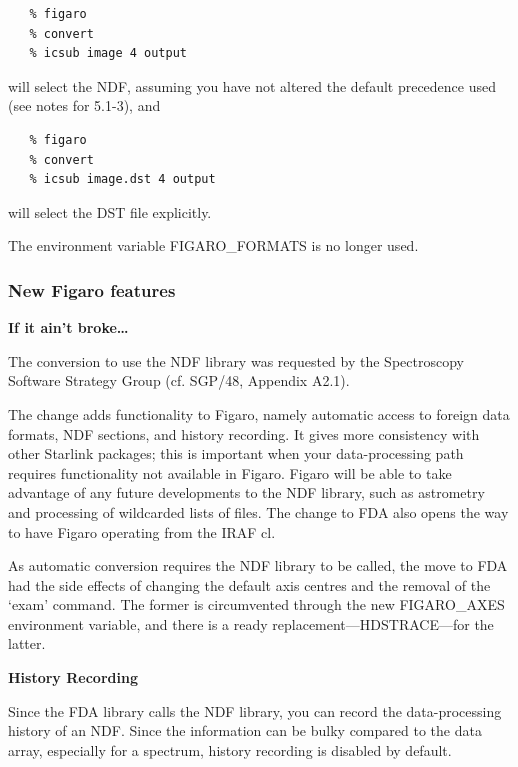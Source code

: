 \documentclass[11pt,twoside]{article}
\begin{document}
\begin{enumerate}
\begin{verbatim}
   % figaro
   % convert
   % icsub image 4 output
\end{verbatim}

      will select the NDF, assuming you have not altered the default
      precedence used (see notes for 5.1-3), and

\begin{verbatim}
   % figaro
   % convert
   % icsub image.dst 4 output
\end{verbatim}

      will select the DST file explicitly.

      The environment variable FIGARO\_FORMATS is no longer used.
\end{enumerate}

\subsubsection{\label{news514_new_features}New Figaro features}

{\bf If it ain't broke\ldots}

   The conversion to use the NDF library was requested by the
   Spectroscopy Software Strategy Group (cf. SGP/48, Appendix
   A2.1).

   The change adds functionality to Figaro, namely automatic
   access to foreign data formats, NDF sections, and history
   recording.  It gives more consistency with other Starlink
   packages; this is important when your data-processing path
   requires functionality not available in Figaro.  Figaro will be
   able to take advantage of any future developments to the NDF
   library, such as astrometry and processing of wildcarded lists
   of files.  The change to FDA also opens the way to have Figaro
   operating from the IRAF cl.

   As automatic conversion requires the NDF library to be called,
   the move to FDA had the side effects of changing the default
   axis centres and the removal of the `exam' command.  The former
   is circumvented through the new FIGARO\_AXES environment
   variable, and there is a ready replacement---HDSTRACE---for the
   latter.


{\bf    History Recording}

   Since the FDA library calls the NDF library, you can record the
   data-processing history of an NDF.  Since the information can
   be bulky compared to the data array, especially for a spectrum,
   history recording is disabled by default.
\end{document}
